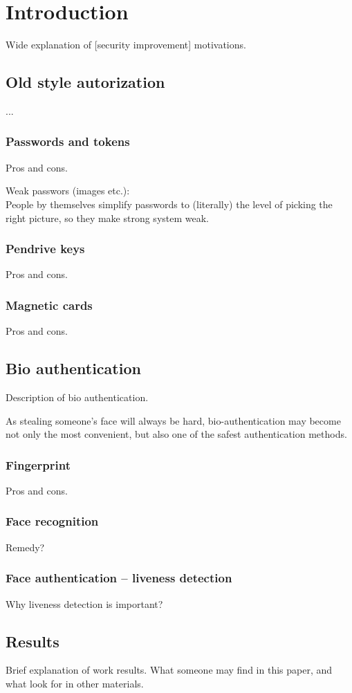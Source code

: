 \section{Introduction}
    Wide explanation of [security improvement] motivations.

    \subsection*{Old style autorization}
        ...

        \subsubsection*{Passwords and tokens}
            Pros and cons.

            Weak passwors (images etc.):\\
            People by themselves simplify passwords to
            (literally) the level of picking the right picture,
            so they make strong system weak.

        \subsubsection*{Pendrive keys}
            Pros and cons.

        \subsubsection*{Magnetic cards}
            Pros and cons.

    \subsection{Bio authentication}
        Description of bio authentication.

        As stealing someone's face will always be hard,
        bio-authentication may become not only the most
        convenient, but also one of the safest
        authentication methods.

        \subsubsection*{Fingerprint}
            Pros and cons.

        \subsubsection{Face recognition}
            Remedy?

        \subsubsection{Face authentication -- liveness detection}
            Why liveness detection is important?

    \subsection{Results}
        Brief explanation of work results.
        What someone may find in this paper,
        and what look for in other materials.
